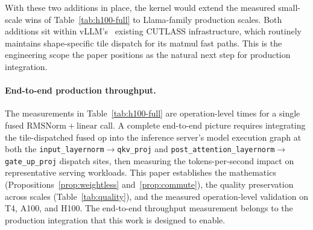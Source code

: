 \documentclass{article}
\begin{document}
With these two additions in place, the kernel would extend the measured small-scale wins of Table~\ref{tab:h100-full} to Llama-family production scales. Both additions sit within vLLM's~\citep{vLLM} existing CUTLASS infrastructure, which routinely maintains shape-specific tile dispatch for its matmul fast paths. This is the engineering scope the paper positions as the natural next step for production integration.

\paragraph{End-to-end production throughput.} The measurements in Table~\ref{tab:h100-full} are operation-level times for a single fused $\mathrm{RMSNorm}+\mathrm{linear}$ call. A complete end-to-end picture requires integrating the tile-dispatched fused op into the inference server's model execution graph at both the \texttt{input\_layernorm}$\to$\texttt{qkv\_proj} and \texttt{post\_attention\_layernorm}$\to$\texttt{gate\_up\_proj} dispatch sites, then measuring the tokens-per-second impact on representative serving workloads. This paper establishes the mathematics (Propositions~\ref{prop:weightless} and~\ref{prop:commute}), the quality preservation across scales (Table~\ref{tab:quality}), and the measured operation-level validation on T4, A100, and H100. The end-to-end throughput measurement belongs to the production integration that this work is designed to enable.

\newpage

\end{document}
